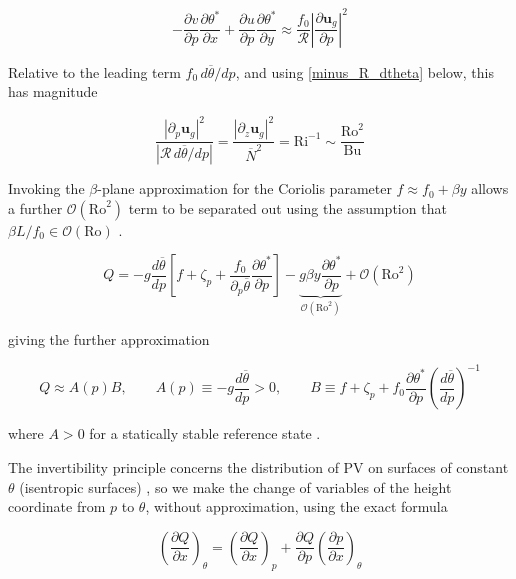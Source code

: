 \documentclass{article}
\begin{document}
\begin{equation}
    -\frac{\partial v}{\partial p}\frac{\partial\theta^*}{\partial x}+\frac{\partial u}{\partial p}\frac{\partial\theta^*}{\partial y} \approx \frac{f_0}{\mathcal{R}} \left|\frac{\partial \bm{u}_g}{\partial p}\right|^2
\end{equation}

Relative to the leading term $f_0\, d\overline\theta/dp$, and using \cref{minus_R_dtheta} below, this has magnitude \cite{Vallis2017}

\begin{equation}
    \frac{\left|\partial_p \bm{u}_g\right|^2}{\left|\mathcal{R}\, d\overline\theta/dp\right|} = \frac{\left|\partial_z \bm{u}_g\right|^2}{\overline N^2} = \mathrm{Ri}^{-1} \sim \frac{\mathrm{Ro}^2}{\mathrm{Bu}}
\end{equation}

Invoking the $\beta$-plane approximation for the Coriolis parameter $f \approx f_0 + \beta y$ \cite{HOLTON_chapter6} allows a further $\mathcal{O}\left(\mathrm{Ro}^2\right)$ term to be separated out using the assumption that $\beta L / f_0 \in \mathcal{O}\left(\mathrm{Ro}\right)$ \cite{Vallis2017}.

\begin{equation}
    Q = -g \frac{d\overline{\theta}}{d p} \left[f + \zeta_p + \frac{f_0}{\partial_p \overline{\theta}} \frac{\partial \theta^*}{\partial p} \right] - \underbrace{g \beta y \frac{\partial \theta^*}{\partial p}}_{\mathcal{O}\left(\mathrm{Ro}^2\right)}  + \mathcal{O}\left(\mathrm{Ro}^2\right)
\end{equation}

giving the further approximation

\begin{equation}\label{let_A_B}
    Q \approx A(p)B, \qquad A(p) \equiv -g \frac{d \overline{\theta}}{dp} > 0, \qquad B \equiv f + \zeta_p + f_0 \frac{\partial \theta^*}{\partial p} \left( \frac{d \overline{\theta}}{dp}\right)^{-1}
\end{equation}

where $A > 0$ for a statically stable reference state \cite{HOLTON_chapter2}.

The invertibility principle concerns the distribution of PV on surfaces of constant $\theta$ (isentropic surfaces) \cite{Hoskins1985}, so we make the change of variables of the height coordinate from $p$ to $\theta$, without approximation, using the exact formula \cite{Vallis2017}

\begin{equation}\label{change_coords}
    \left(\frac{\partial Q}{\partial x}\right)_\theta = \left(\frac{\partial Q }{\partial x}\right)_p + \frac{\partial Q }{\partial p}\left(\frac{\partial p}{\partial x}\right)_\theta
\end{equation}
\end{document}
